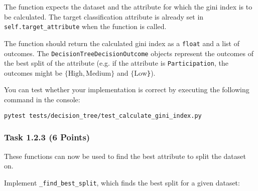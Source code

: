 \documentclass[
english,
smallborders
]{i6prcsht}
\newcommand{\points}[1]{\hfill \color{red}(#1 Points)\color{black}}
\begin{document}
The function expects the dataset and the attribute for which the gini index is to be calculated. The target classification attribute is already set in \texttt{self.target\_attribute} when the function is called.

The function should return the calculated gini index as a \texttt{float} and a list of outcomes. The \texttt{DecisionTreeDecisionOutcome} objects represent the outcomes of the best split of the attribute (e.g. if the attribute is \texttt{Participation}, the outcomes might be \texttt{$\{\text{High}, \text{Medium}\}$} and \texttt{$\{\text{Low}$\}}).

You can test whether your implementation is correct by executing the following command in the console:

\vspace*{0.3cm}

\begin{lstlisting}
pytest tests/decision_tree/test_calculate_gini_index.py
\end{lstlisting}

\newpage

\subsubsection*{Task 1.2.3 \points{6}}

These functions can now be used to find the best attribute to split the dataset on.

Implement \texttt{\_find\_best\_split}, which finds the best split for a given dataset:

\vspace*{0.3cm}
\end{document}
